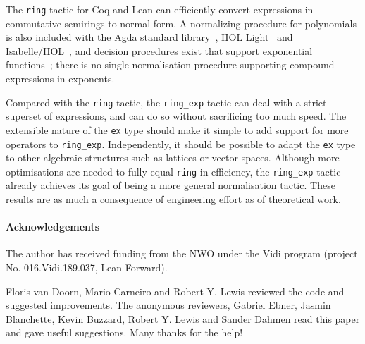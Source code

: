 \documentclass{llncs}
\newcommand{\lean}[1]{\texttt{#1}\xspace} %
\newcommand{\ex}{\lean{ex}}
\newcommand{\ring}{\lean{ring}}
\newcommand{\ringexp}{\lean{ring\_exp}}
\begin{document}
The \ring tactic for Coq and Lean can efficiently convert expressions in commutative semirings to normal form.
A normalizing procedure for polynomials is also included with the Agda standard library~\cite{agda-stdlib}, HOL Light~\cite{hol_light} and Isabelle/HOL~\cite{isabelle_hol},
and decision procedures exist that support exponential functions~\cite{resolution-rcf};
there is no single normalisation procedure supporting compound expressions in exponents.

Compared with the \ring tactic, the \ringexp tactic can deal with a strict superset of expressions,
and can do so without sacrificing too much speed.
The extensible nature of the \ex type should make it simple to add support for more operators to \ringexp.
Independently, it should be possible to adapt the \ex type to other algebraic structures
such as lattices or vector spaces.
Although more optimisations are needed to fully equal \ring in efficiency,
the \ringexp tactic already achieves its goal of being a more general normalisation tactic.
These results are as much a consequence of engineering effort as of theoretical work.


\paragraph{Acknowledgements}
The author has received funding from the NWO under the Vidi program (project
No. 016.Vidi.189.037, Lean Forward).

Floris van Doorn, Mario Carneiro and Robert Y. Lewis reviewed the code and
suggested improvements.
The anonymous reviewers, Gabriel Ebner, Jasmin Blanchette, Kevin Buzzard, Robert Y. Lewis and Sander Dahmen read this paper and gave useful suggestions.
Many thanks for the help!

\printbibliography
\end{document}
